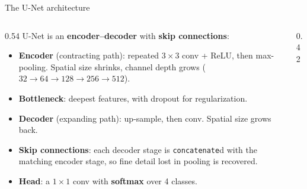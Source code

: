 \documentclass[10pt,aspectratio=169]{beamer}
\begin{document}
\begin{frame}{The U-Net architecture}
  \begin{columns}[T,onlytextwidth]
  \begin{column}{0.54\textwidth}
  \small
  U-Net is an \textbf{encoder--decoder} with \textbf{skip connections}:
  \begin{itemize}
    \item \textbf{Encoder} (contracting path): repeated $3\times3$ conv + ReLU, then max-pooling.
          Spatial size shrinks, channel depth grows ($32\!\to\!64\!\to\!128\!\to\!256\!\to\!512$).
    \item \textbf{Bottleneck}: deepest features, with dropout for regularization.
    \item \textbf{Decoder} (expanding path): up-sample, then conv. Spatial size grows back.
    \item \textbf{Skip connections}: each decoder stage is \texttt{concatenate}d with the matching
          encoder stage, so fine detail lost in pooling is recovered.
    \item \textbf{Head}: a $1\times1$ conv with \textbf{softmax} over 4 classes.
  \end{itemize}
  \end{column}
  \begin{column}{0.42\textwidth}
  \centering
  \end{column}
  \end{columns}
\end{frame}
\end{document}
